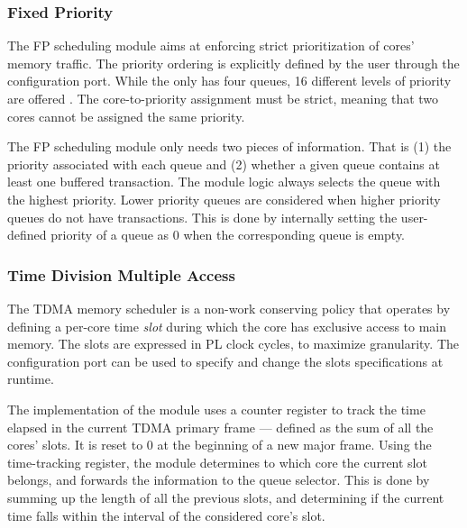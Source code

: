 \subsubsection{Fixed Priority}\label{sec:fixed_prio}
The FP scheduling module aims at enforcing strict prioritization of
cores' memory traffic. The priority ordering is explicitly defined by
the user through the configuration port. While the \schim
{} only has four queues, 16 different
levels of priority are offered . The core-to-priority assignment must
be strict, meaning that two cores cannot be assigned the same
priority.

The FP scheduling module only needs two pieces of information. That is
(1) the priority associated with each queue and (2) whether a given
queue contains at least one buffered transaction. The module logic
always selects the queue with the highest priority. Lower priority
queues are considered when higher priority queues do not have
transactions. This is done by internally setting the user-defined
priority of a queue as 0 when the corresponding queue is empty.

\subsubsection{Time Division Multiple Access}
The TDMA memory scheduler is a non-work conserving policy that
operates by defining a per-core time \emph{slot} during which the core
has exclusive access to main memory.  The slots are expressed in PL
clock cycles, to maximize granularity. The configuration port can be
used to specify and change the slots specifications at runtime.

The implementation of the module uses a counter register to track the
time elapsed in the current TDMA primary frame --- defined as the sum of
all the cores' slots. It is reset to 0 at the beginning of a new major
frame. Using the time-tracking register, the module determines to
which core the current slot belongs, and forwards the information to
the queue selector. This is done by summing up the length of all the
previous slots, and determining if the current time falls within the
interval of the considered core's slot.


